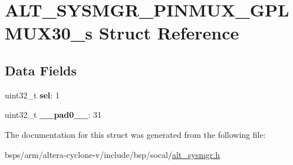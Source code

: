 \hypertarget{structALT__SYSMGR__PINMUX__GPLMUX30__s}{}\section{A\+L\+T\+\_\+\+S\+Y\+S\+M\+G\+R\+\_\+\+P\+I\+N\+M\+U\+X\+\_\+\+G\+P\+L\+M\+U\+X30\+\_\+s Struct Reference}
\label{structALT__SYSMGR__PINMUX__GPLMUX30__s}
\subsection*{Data Fields}
\begin{DoxyCompactItemize}
\item 
\mbox{\label{structALT__SYSMGR__PINMUX__GPLMUX30__s_aef9be76a53aa36087f5ce2926739c004}} 
uint32\+\_\+t {\bfseries sel}\+: 1
\item 
\mbox{\label{structALT__SYSMGR__PINMUX__GPLMUX30__s_ae6e297a9b385cea9b5c77964ec9c6b0c}} 
uint32\+\_\+t {\bfseries \+\_\+\+\_\+pad0\+\_\+\+\_\+}\+: 31
\end{DoxyCompactItemize}


The documentation for this struct was generated from the following file\+:\begin{DoxyCompactItemize}
\item 
bsps/arm/altera-\/cyclone-\/v/include/bsp/socal/\mbox{\hyperlink{alt__sysmgr_8h}{alt\+\_\+sysmgr.\+h}}\end{DoxyCompactItemize}
